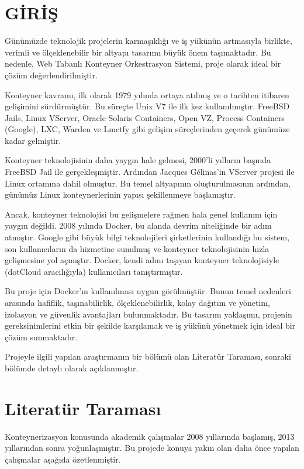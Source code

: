 \section{GİRİŞ}
Günümüzde teknolojik projelerin karmaşıklığı ve iş yükünün artmasıyla birlikte, verimli ve ölçeklenebilir bir altyapı tasarımı büyük önem taşımaktadır. Bu nedenle, Web Tabanlı Konteyner Orkestrasyon Sistemi, proje olarak ideal bir çözüm değerlendirilmiştir.

Konteyner kavramı, ilk olarak 1979 yılında ortaya atılmış ve o tarihten itibaren gelişimini sürdürmüştür. Bu süreçte Unix V7 ile ilk kez kullanılmıştır. FreeBSD Jails, Linux VServer, Oracle Solaris Containers, Open VZ, Process Containers (Google), LXC, Warden ve Lmctfy gibi gelişim süreçlerinden geçerek günümüze kadar gelmiştir.

Konteyner teknolojisinin daha yaygın hale gelmesi, 2000'li yılların başında FreeBSD Jail ile gerçekleşmiştir. Ardından Jacques Gélinas'in VServer projesi ile Linux ortamına dahil olmuştur. Bu temel altyapının oluşturulmasının ardından, günümüz Linux konteynerlerinin yapısı şekillenmeye başlamıştır.

Ancak, konteyner teknolojisi bu gelişmelere rağmen hala genel kullanım için yaygın değildi. 2008 yılında Docker, bu alanda devrim niteliğinde bir adım atmıştır. Google gibi büyük bilgi teknolojileri şirketlerinin kullandığı bu sistem, son kullanıcıların da hizmetine sunulmuş ve konteyner teknolojisinin hızla gelişmesine yol açmıştır. Docker, kendi adını taşıyan konteyner teknolojisiyle (dotCloud aracılığıyla) kullanıcıları tanıştırmıştır.\cite{container}

Bu proje için Docker'ın kullanılması uygun görülmüştür. Bunun temel nedenleri arasında hafiflik, taşınabilirlik, ölçeklenebilirlik, kolay dağıtım ve yönetim, izolasyon ve güvenlik avantajları bulunmaktadır. Bu tasarım yaklaşımı, projenin gereksinimlerini etkin bir şekilde karşılamak ve iş yükünü yönetmek için ideal bir çözüm sunmaktadır.

Projeyle ilgili yapılan araştırmanın bir bölümü olan Literatür Taraması, sonraki bölümde detaylı olarak açıklanmıştır.
\section{Literatür Taraması}
Konteynerizasyon konusunda akademik çalışmalar 2008 yıllarında başlamış, 2013 yıllarından sonra yoğunlaşmıştır. Bu projede konuya yakın olan daha önce yapılan çalışmalar aşağıda özetlenmiştir.

